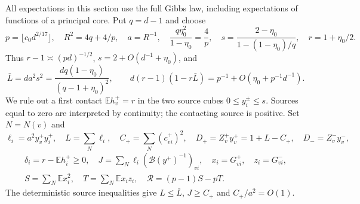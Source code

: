 \documentclass[10pt]{article}
\numberwithin{equation}{section}
\newcommand{\1}{\mathbf1}
\begin{document}
All expectations in this section use the full Gibbs law, including
expectations of functions of a principal core. Put $q=d-1$ and choose
\[
 p=\lfloor c_0d^{2/17}\rfloor,\quad R^2=4q+4/p,\quad a=R^{-1},
 \quad \frac{q\eta_0^2}{1-\eta_0}=\frac4p,
 \quad s=\frac{2-\eta_0}{1-(1-\eta_0)/q},\quad r=1+\eta_0/2.
 \tag{D1}\label{eq:compressed-parameters}
\]
Thus $r-1\asymp(pd)^{-1/2}$, $s=2+O(d^{-1}+\eta_0)$, and
\[
 \bar L=da^2s^2=\frac{dq(1-\eta_0)}{(q-1+\eta_0)^2},
 \qquad d(r-1)(1-r\bar L)=p^{-1}+O(\eta_0+p^{-1}d^{-1}).
 \tag{D2}\label{eq:compressed-geometric-drift}
\]
We rule out a first contact $\mathbb E h_v^+=r$ in the two source
cubes $0\le y_i^\pm\le s$. Sources equal to zero are interpreted by
continuity; the contacting source is positive. Set $N=N(v)$ and
\[
 \ell_i=a^2y_v^+y_i^+,\quad L=\sum_N\ell_i,\quad
 C_+=\sum_N(c_{vi}^+)^2,\quad D_+=Z_v^+y_v^+=1+L-C_+,
 \quad D_-=Z_v^-y_v^-,
\]
\[
 \begin{gathered}
 \delta_i=r-\mathbb E h_i^+\ge0,\quad
 J=\sum_N\ell_i(\mathcal B(y^+)^{-1})_{vi},\quad
 x_i=G^+_{vi},\quad z_i=G^-_{vi},\\
 S=\sum_N\mathbb E x_i^2,\quad T=\sum_N\mathbb E x_iz_i,
 \quad \mathcal R=(p-1)S-pT.
 \end{gathered}
\]
The deterministic source inequalities give $L\le\bar L$,
$J\ge C_+$ and $C_+/a^2=O(1)$.
\end{document}
